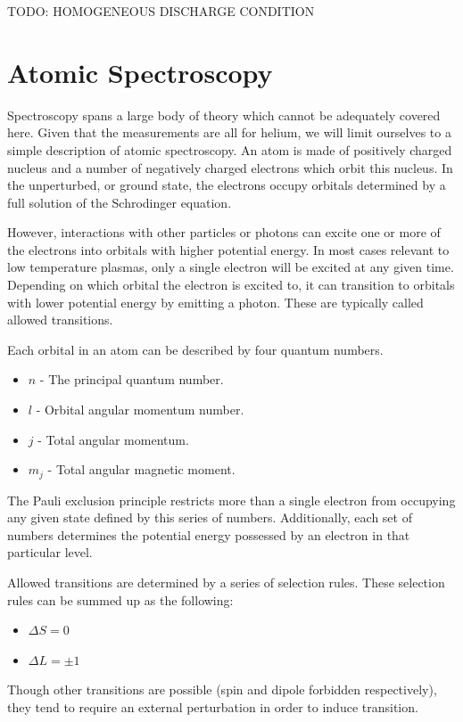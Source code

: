 TODO: HOMOGENEOUS DISCHARGE CONDITION

\section{Atomic Spectroscopy}

Spectroscopy spans a large body of theory which cannot be adequately
covered here. Given that the measurements are all for helium, we will
limit ourselves to a simple description of atomic spectroscopy. An atom
is made of positively charged nucleus and a number of negatively charged
electrons which orbit this nucleus. In the unperturbed, or ground state,
the electrons occupy orbitals determined by a full solution of the
Schrodinger equation.

However, interactions with other particles or photons can excite one or
more of the electrons into orbitals with higher potential energy. In
most cases relevant to low temperature plasmas, only a single electron
will be excited at any given time. Depending on which orbital the
electron is excited to, it can transition to orbitals with lower
potential energy by emitting a photon. These are typically called
allowed transitions.

Each orbital in an atom can be described by four quantum numbers.
\begin{itemize}
  \item $n$ - The principal quantum number.
  \item $l$ - Orbital angular momentum number.
  \item $j$ - Total angular momentum.
  \item $m_j$ - Total angular magnetic moment.
\end{itemize}
The Pauli exclusion principle restricts more than a single electron from
occupying any given state defined by this series of numbers.
Additionally, each set of numbers determines the potential energy
possessed by an electron in that particular level. 

Allowed transitions are determined by a series of selection rules. These
selection rules can be summed up as the following:
\begin{itemize}
    \item $\Delta S = 0$
    \item $\Delta L = \pm1$
\end{itemize}
Though other transitions are possible (spin and dipole forbidden respectively),
they tend to require an external perturbation in order to induce transition.

